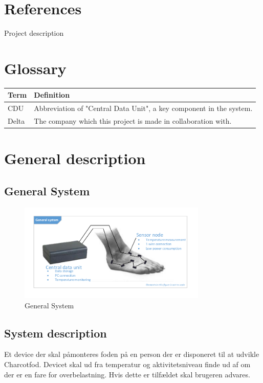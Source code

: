 \section{References}
Project description

\section{Glossary}
\begin{table}[H]
\centering
\begin{tabular}{|p{4cm}|p{7cm}|}
\hline
Term & Definition\\ \hline
CDU & Abbreviation of "Central Data Unit", a key component in the system. \\ \hline
Delta & The company which this project is made in collaboration with.\\ \hline
\end{tabular}
\end{table}

\section{General description}

\subsection{General System}
\begin{figure}[H]
	\centering
	\includegraphics[width=0.8\textwidth]{billeder/GeneralSystem}
	\caption{General System}
\end{figure}

\subsection{System description}
Et device der skal påmonteres foden på en person der er disponeret til at udvikle Charcotfod. Devicet skal ud fra temperatur og aktivitetsniveau finde ud af om der er en fare for overbelastning. Hvis dette er tilfældet skal brugeren advares.


